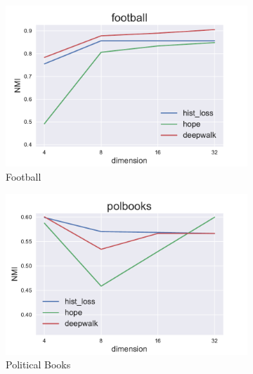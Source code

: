\documentclass[12pt,a4paper]{extarticle}
\begin{document}
    \begin{figure}
    \begin{subfigure}{.5\linewidth}
    \centering
    \includegraphics[width=\linewidth]{src/images/Node_clusterization_football.pdf}
    \caption{Football}
    \label{fig:clus_foot}
    \end{subfigure}
    \begin{subfigure}{.5\linewidth}
    \centering
    \includegraphics[width=\linewidth]{src/images/Node_clusterization_polbooks.pdf}
    \caption{Political Books}
    \label{fig:clas_pol}
    \end{subfigure}
    \\[1ex]
    \begin{subfigure}{.5\linewidth}
    \centering

\end{subfigure}
\end{figure}
\end{document}
